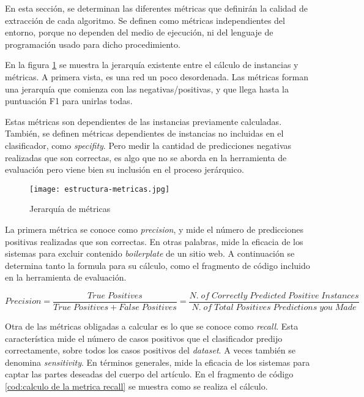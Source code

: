 En esta sección, se determinan las diferentes métricas que definirán la calidad de extracción de cada 
algoritmo. Se definen como métricas independientes del entorno, porque no dependen del medio de ejecución, 
ni del lenguaje de programación usado para dicho procedimiento.

En la figura \ref{img:jerarquia de metricas} se muestra la jerarquía existente entre el cálculo de instancias
y métricas. A primera vista, es una red un poco desordenada. Las métricas forman una jerarquía que comienza
con las negativas/positivas, y que llega hasta la puntuación F1 para unirlas todas.

Estas métricas son dependientes de las instancias previamente calculadas. También, se definen métricas
dependientes de instancias no incluidas en el clasificador, como \emph{specifity}. Pero medir la cantidad 
de predicciones negativas realizadas que son correctas, es algo que no se aborda en la herramienta de
evaluación pero viene bien su inclusión en el proceso jerárquico.

\begin{figure}[tphb]
  \centering
  \texttt{[image: estructura-metricas.jpg]}
  \caption{Jerarquía de métricas}
  \label{img:jerarquia de metricas}
\end{figure}

La primera métrica se conoce como \emph{precision}, y mide el número de predicciones positivas realizadas
que son correctas. En otras palabras, mide la eficacia de los sistemas para excluir contenido
\emph{boilerplate} de un sitio web. A continuación se determina tanto la formula para su cálculo, como el
fragmento de código incluido en la herramienta de evaluación.

\begin{equation*}
  Precision = \frac{True\;Positives}{True\;Positives + False\;Positives} = 
  \frac{N.\;of\;Correctly\;Predicted\;Positive\;Instances}{N.\;of\;Total\;Positives\;Predictions\;you\;Made}
\end{equation*}

\begin{codefloat}
  
  \caption{Cálculo de la métrica \emph{precision}}
  \label{cod:calculo de la metrica precision}
\end{codefloat}

Otra de las métricas obligadas a calcular es lo que se conoce como \emph{recall}. Esta característica mide
el número de casos positivos que el clasificador predijo correctamente, sobre todos los casos positivos del
\emph{dataset}. A veces también se denomina \emph{sensitivity}. En términos generales, mide la eficacia de
los sistemas para captar las partes deseadas del cuerpo del artículo. En el fragmento de código
\ref{cod:calculo de la metrica recall} se muestra como se realiza el cálculo.

